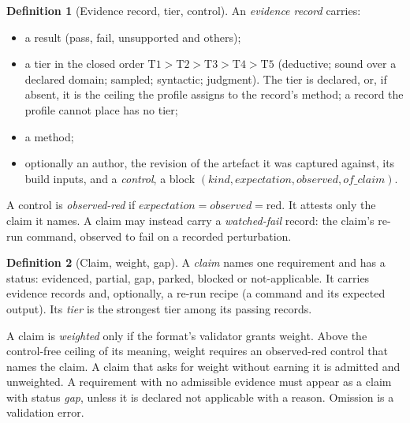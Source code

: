 \documentclass[11pt]{article}
\theoremstyle{definition}
\newtheorem{definition}{Definition}
\theoremstyle{remark}
\newcommand{\T}[1]{\mathrm{T}#1}
\begin{document}
\begin{definition}[Evidence record, tier, control]
An \emph{evidence record} carries:
\begin{itemize}[itemsep=1pt]
\item a result (pass, fail, unsupported and others);
\item a tier in the closed order $\T1>\T2>\T3>\T4>\T5$ (deductive; sound over a declared domain;
  sampled; syntactic; judgment). The tier is declared, or, if absent, it is the ceiling the
  profile assigns to the record's method; a record the profile cannot place has no tier;
\item a method;
\item optionally an author, the revision of the artefact it was captured against, its build
  inputs, and a \emph{control}, a block $(\mathit{kind},\mathit{expectation},\mathit{observed},
  \mathit{of\_claim})$.
\end{itemize}
A control is \emph{observed-red} if $\mathit{expectation}=\mathit{observed}=\text{red}$. It attests
only the claim it names. A claim may instead carry a \emph{watched-fail} record: the claim's
re-run command, observed to fail on a recorded perturbation.
\end{definition}

\begin{definition}[Claim, weight, gap]
A \emph{claim} names one requirement and has a status: evidenced, partial, gap, parked, blocked or
not-applicable. It carries evidence records and, optionally, a re-run recipe (a command and its
expected output). Its \emph{tier} is the strongest tier among its passing records.

A claim is \emph{weighted} only if the format's validator grants weight. Above the control-free
ceiling of its meaning, weight requires an observed-red control that names the claim. A claim that
asks for weight without earning it is admitted and unweighted. A requirement with no admissible
evidence must appear as a claim with status \emph{gap}, unless it is declared not applicable with a
reason. Omission is a validation error.
\end{definition}
\end{document}
